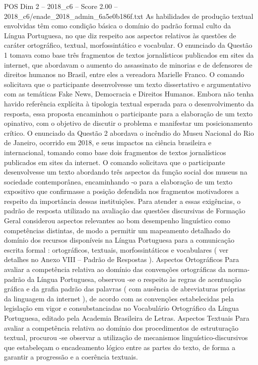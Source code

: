 \begin{textsample}{POS Dim 2 – 2018\_c6 – Score 2.00 – 2018\_c6/enade\_2018\_admin\_6a5e0b186f.txt}
As habilidades de produção textual envolvidas têm como condição básica o domínio do padrão formal culto da Língua Portuguesa, no que diz respeito aos aspectos relativos às questões de caráter ortográfico, textual, morfossintático e vocabular.
O enunciado da Questão 1 tomava como base três fragmentos de textos jornalísticos publicados em sites da internet, que abordavam o aumento do assassinato de minorias e de defensores de direitos humanos no Brasil, entre eles a vereadora Marielle Franco.
O comando solicitava que o participante desenvolvesse um texto dissertativo e argumentativo com as temáticas Fake News, Democracia e Direitos Humanos.
Embora não tenha havido referência explícita à tipologia textual esperada para o desenvolvimento da resposta, essa proposta encaminhou o participante para a elaboração de um texto opinativo, com o objetivo de discutir o problema e manifestar um posicionamento crítico.
O enunciado da Questão 2 abordava o incêndio do Museu Nacional do Rio de Janeiro, ocorrido em 2018, e seus impactos na ciência brasileira e internacional, tomando como base dois fragmentos de textos jornalísticos publicados em sites da internet.
O comando solicitava que o participante desenvolvesse um texto abordando três aspectos da função social dos museus na sociedade contemporânea, encaminhando -o para a elaboração de um texto expositivo que confirmasse a posição defendida nos fragmentos motivadores a respeito da importância dessas instituições.
Para atender a essas exigências, o padrão de resposta utilizado na avaliação das questões discursivas de Formação Geral considerou aspectos relevantes ao bom desempenho linguístico como competências distintas, de modo a permitir um mapeamento detalhado do domínio dos recursos disponíveis na Língua Portuguesa para a comunicação escrita formal : ortográficos, textuais, morfossintáticos e vocabulares ( ver detalhes no Anexo VIII – Padrão de Respostas ).
Aspectos Ortográficos Para avaliar a competência relativa ao domínio das convenções ortográficas da norma-padrão da Língua Portuguesa, observou -se o respeito às regras de acentuação gráfica e da grafia padrão das palavras ( com ausência de abreviaturas próprias da linguagem da internet ), de acordo com as convenções estabelecidas pela legislação em vigor e consubstanciadas no Vocabulário Ortográfico da Língua Portuguesa, editado pela Academia Brasileira de Letras.
Aspectos Textuais Para avaliar a competência relativa ao domínio dos procedimentos de estruturação textual, procurou -se observar a utilização de mecanismos linguístico-discursivos que estabeleçam o encadeamento lógico entre as partes do texto, de forma a garantir a progressão e a coerência textuais.

\end{textsample}
